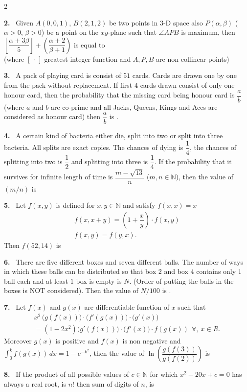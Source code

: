 \documentclass[10pt]{extarticle}
\newcommand{\qn}[1]{\par\smallskip\noindent\textbf{#1.}~}
\begin{document}
\begin{multicols}{2}
\qn{2} Given $A(0,0,1)$, $B(2,1,2)$ be two points in 3-D space also $P(\alpha,\beta)$ ($\alpha>0$, $\beta>0$) be a point on the $xy$-plane such that $\angle APB$ is maximum, then $\left[\dfrac{\alpha+3\beta}{5}\right]+\left(\dfrac{\alpha+2}{\beta+1}\right)$ is equal to\\
(where $[\,\cdot\,]$ greatest integer function and $A,P,B$ are non collinear points)
\qn{3} A pack of playing card is consist of $51$ cards. Cards are drawn one by one from the pack without replacement. If first $4$ cards drawn consist of only one honour card, then the probability that the missing card being honour card is $\dfrac ab$ (where $a$ and $b$ are co-prime and all Jacks, Queens, Kings and Aces are considered as honour card) then $\dfrac ab$ is \underline{\hspace{1.5cm}}.
\qn{4} A certain kind of bacteria either die, split into two or split into three bacteria. All splits are exact copies. The chances of dying is $\dfrac14$, the chances of splitting into two is $\dfrac12$ and splitting into three is $\dfrac14$. If the probability that it survives for infinite length of time is $\dfrac{m-\sqrt{13}}{n}$ ($m,n\in\mathbb N$), then the value of $(m/n)$ is
\qn{5} Let $f(x,y)$ is defined for $x,y\in\mathbb N$ and satisfy $f(x,x)=x$
\begin{gather*}
f(x,x+y)=\left(1+\dfrac xy\right)\cdot f(x,y)\\
f(x,y)=f(y,x).
\end{gather*}
Then $f(52,14)$ is
\qn{6} There are five different boxes and seven different balls. The number of ways in which these balls can be distributed so that box $2$ and box $4$ contains only $1$ ball each and at least $1$ box is empty is $N$. (Order of putting the balls in the boxes is NOT considered). Then the value of $N/100$ is \underline{\hspace{1.5cm}}.
\qn{7} Let $f(x)$ and $g(x)$ are differentiable function of $x$ such that
\begin{gather*}x^2\,\bigl(g(f(x))\bigr)\cdot\bigl(f'(g(x))\bigr)\cdot\bigl(g'(x)\bigr)\\ =(1-2x^2)\bigl(g'(f(x))\bigr)\cdot\bigl(f'(x)\bigr)\cdot f(g(x))\ \ \forall,\ x\in R.\end{gather*}
Moreover $g(x)$ is positive and $f(x)$ is non negative and $\displaystyle\int_0^kf(g(x))\,dx=1-e^{-k^2}$, then the value of $\ln\left(\dfrac{g(f(3))}{g(f(2))}\right)$ is \underline{\hspace{1.5cm}}
\qn{8} If the product of all possible values of $c\in\mathbb N$ for which $x^2-20x+c=0$ has always a real root, is $n!$ then sum of digits of $n$, is

\end{multicols}
\end{document}
